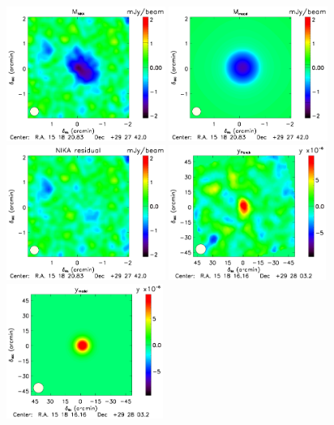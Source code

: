\documentclass[traditabstract]{aa}
\begin{document}
\begin{figure}[h]
\centering
\includegraphics[height=4.4cm]{MCMC_data2.pdf}
\hspace{0.7cm}
\includegraphics[height=4.4cm]{ML_NIKA_Planck11.pdf}
\hspace{0.8cm}
\includegraphics[height=4.4cm]{Residual_NIKA_planck11.pdf}
\includegraphics[height=4.4cm]{Planck_data21.pdf}
\hspace{0.8cm}
\includegraphics[height=4.4cm]{ML_NIKA_Planck31.pdf}

\end{figure}
\end{document}
